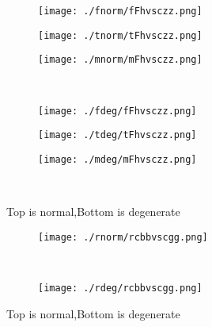 \documentclass[aps,floats,floatfix,nofootinbib]{revtex4-1}
\begin{document}
\begin{center}
\begin{figure}
\begin{subfigure}{0.3\textwidth}
\texttt{[image: ./fnorm/fFhvsczz.png]}
\label{}
\end{subfigure}
\begin{subfigure}{0.3\textwidth}
\texttt{[image: ./tnorm/tFhvsczz.png]}
\label{}
\end{subfigure}
\begin{subfigure}{0.3\textwidth}
\texttt{[image: ./mnorm/mFhvsczz.png]}
\label{}
\end{subfigure}\\
\begin{subfigure}{0.3\textwidth}
\texttt{[image: ./fdeg/fFhvsczz.png]}
\label{}
\end{subfigure}
\begin{subfigure}{0.3\textwidth}
\texttt{[image: ./tdeg/tFhvsczz.png]}
\label{}
\end{subfigure}
\begin{subfigure}{0.3\textwidth}
\texttt{[image: ./mdeg/mFhvsczz.png]}
\label{}
\end{subfigure}\\
\caption{Top is normal,Bottom is degenerate}
\end{figure}
\end{center}

\begin{center}
\begin{figure}
\begin{subfigure}{0.95\textwidth}
\texttt{[image: ./rnorm/rcbbvscgg.png]}
\label{}
\end{subfigure}\\
\begin{subfigure}{0.95\textwidth}
\texttt{[image: ./rdeg/rcbbvscgg.png]}
\label{}
\end{subfigure}
\caption{Top is normal,Bottom is degenerate}
\end{figure}
\end{center}
\end{document}
